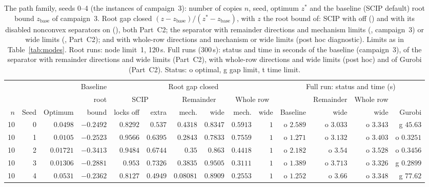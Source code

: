 \begin{table}[ht]
\centering\scriptsize
\setlength{\tabcolsep}{3pt}
\caption{The path family, seeds 0--4 (the instances of campaign~3): number of copies $n$, seed, optimum $z^\ast$ and the baseline (SCIP default) root bound $z_{\text{base}}$ of campaign~3. Root gap closed $(z-z_{\text{base}})/(z^\ast-z_{\text{base}})$, with $z$ the root bound of: SCIP with  off () and with its disabled nonconvex separators on (), both Part~C2; the separator with remainder directions and mechanism limits (, campaign~3) or wide limits (, Part~C2); and with whole-row directions and mechanism or wide limits (post hoc diagnostic). Limits as in Table~\ref{tab:modes}. Root runs: node limit~1, 120\,s. Full runs (300\,s): status and time in seconds of the baseline (campaign~3), of the separator with remainder directions and wide limits (Part~C2), with whole-row directions and wide limits (post hoc) and of Gurobi (Part~C2). Status: o optimal, g gap limit, t time limit.}\label{tab:path-detail}
\begin{tabular}{@{}rrrrrrrrrrrrrr@{}}
\toprule
& & & Baseline & \multicolumn{6}{c}{Root gap closed} & \multicolumn{4}{c}{Full run: status and time (s)}\\
\cmidrule(lr){5-10}\cmidrule(l){11-14}
& & & root & \multicolumn{2}{c}{SCIP} & \multicolumn{2}{c}{Remainder} & \multicolumn{2}{c}{Whole row} & & Remainder & Whole row &\\
\cmidrule(lr){5-6}\cmidrule(lr){7-8}\cmidrule(lr){9-10}
$n$ & Seed & Optimum & bound & locks off & extra & mech. & wide & mech. & wide & Baseline & wide & wide & Gurobi\\
\midrule
10 & 0 & $0.0498$ & $-0.2492$ & $0.8292$ & $0.537$ & $0.4318$ & $0.8347$ & $0.5913$ & $1$ & o $2.589$ & o $3.033$ & o $3.343$ & g $45.63$\\
10 & 1 & $0.0105$ & $-0.2523$ & $0.9566$ & $0.6395$ & $0.2843$ & $0.7833$ & $0.7559$ & $1$ & o $1.271$ & o $3.132$ & o $3.403$ & o $0.3251$\\
10 & 2 & $0.01721$ & $-0.3413$ & $0.9484$ & $0.6744$ & $0.35$ & $0.863$ & $0.4418$ & $1$ & o $2.182$ & o $3.54$ & o $3.528$ & o $0.3456$\\
10 & 3 & $0.01306$ & $-0.2881$ & $0.953$ & $0.7326$ & $0.3835$ & $0.9505$ & $0.3111$ & $1$ & o $1.389$ & o $3.713$ & o $3.326$ & g $0.2899$\\
10 & 4 & $0.0531$ & $-0.2362$ & $0.8127$ & $0.4949$ & $0.08081$ & $0.8909$ & $0.2553$ & $1$ & o $1.252$ & o $3.66$ & o $3.348$ & g $77.62$\\

\end{tabular}
\end{table}
